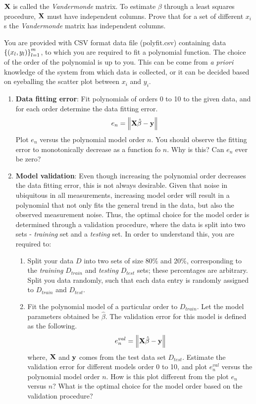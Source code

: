 \documentclass[9pt]{article}
\def\mf{\ensuremath\mathbf}
\def\lp{\ensuremath\left(}
\def\rp{\ensuremath\right)}
\def\lV{\ensuremath\left\lVert}
\def\rV{\ensuremath\right\rVert}
\def\lc{\ensuremath\left\{}
\def\rc{\ensuremath\right\}}
\begin{document}
\begin{multicols}{2}
\begin{enumerate}
    $\mf{X}$ is called the \textit{Vandermonde} matrix. To estimate $\beta$ through a least squares procedure, $\mf{X}$ must have independent columns. Prove that for a set of different $x_i$s the \textit{Vandermonde} matrix has independent columns.

    You are provided with CSV format data file (polyfit.csv) containing data $\lc\lp x_l, y_l \rp\rc_{l=1}^{m}$, to which you are required to fit a polynomial function. The choice of the order of the polynomial is up to you. This can be come from \textit{a priori} knowledge of the system from which data is collected, or it can be decided based on eyeballing the scatter plot between $x_i$ and $y_i$. 

    \begin{enumerate}
        \item \textbf{Data fitting error}: Fit polynomials of orders 0 to 10 to the given data, and for each order determine the data fitting error.
        \[ e_n = \lV\mf{X}\hat{\beta} - \mf{y}\rV \]
        Plot $e_n$ versus the polynomial model order $n$. You should observe the fitting error to monotonically decrease as a function fo $n$. Why is this? Can $e_n$ ever be zero?

        \item \textbf{Model validation}: Even though increasing the polynomial order decreases the data fitting error, this is not always desirable. Given that noise in ubiquitous in all measurements, increasing model order will result in a polynomial that not only fits the general trend in the data, but also the observed measurement noise. Thus, the optimal choice for the model order is determined through a validation procedure, where the data is split into two sets - \textit{training} set and a \textit{testing} set. In order to understand this, you are required to:
        \begin{enumerate}
            \item Split your data $D$ into two sets of size 80\% and 20\%, corresponding to the \textit{training} $D_{train}$ and \textit{testing} $D_{test}$ sets; these percentages are arbitrary. Split you data randomly, such that each data entry is randomly assigned to $D_{train}$ and $D_{test}$.

            \item Fit the polynomial model of a particular order to $D_{train}$. Let the model parameters obtained be $\hat{\beta}$. The validation error for this model is defined as the following.
            \[ e_n^{val} = \lV\mf{X}\hat{\beta} - \mf{y}\rV \]
            where, $\mf{X}$ and $\mf{y}$ comes from the test data set $D_{test}$. Estimate the validation error for different models order 0 to 10, and plot $e_n^{val}$ versus the polynomial model order $n$. How is this plot different from the plot $e_n$ versus $n$? What is the optimal choice for the model order based on the validation procedure?
        \end{enumerate}


\end{enumerate}
\end{enumerate}
\end{multicols}
\end{document}
